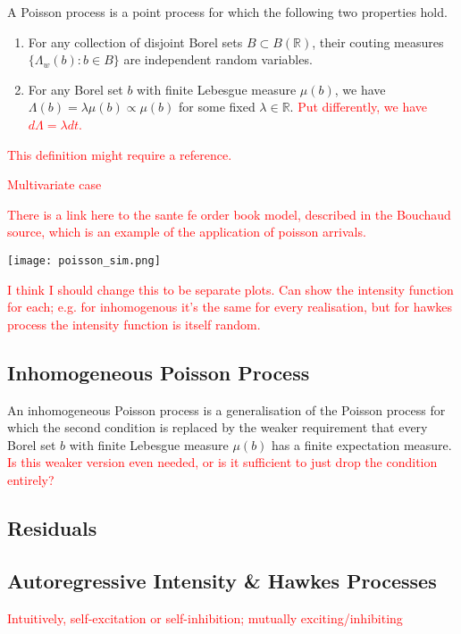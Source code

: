 \documentclass[honours,12pt]{unswthesis}
\numberwithin{equation}{section}
\begin{document}
A Poisson process is a point process for which the following two properties hold.
\begin{enumerate}
	\item For any collection of disjoint Borel sets $B\subset B(\mathbb R)$, their couting measures $\{\Lambda_w(b) : b\in B\}$ are independent random variables.
	\item For any Borel set $b$ with finite Lebesgue measure $\mu(b)$, we have $\Lambda(b)=\lambda \mu(b)\propto \mu(b)$ for some fixed $\lambda\in\mathbb{R}$. \textcolor{red}{Put differently, we have $d\Lambda=\lambda dt$.}
\end{enumerate}

\textcolor{red}{This definition might require a reference.}

\textcolor{red}{Multivariate case}

\textcolor{red}{There is a link here to the sante fe order book model, described in the Bouchaud source, which is an example of the application of poisson arrivals.}

\texttt{[image: poisson\_sim.png]}

\textcolor{red}{I think I should change this to be separate plots. Can show the intensity function for each; e.g. for inhomogenous it's the same for every realisation, but for hawkes process the intensity function is itself random.}


\subsection{Inhomogeneous Poisson Process}
An inhomogeneous Poisson process is a generalisation of the Poisson process for which the second condition is replaced by the weaker requirement that every Borel set $b$ with finite Lebesgue measure $\mu(b)$ has a finite expectation measure. \textcolor{red}{Is this weaker version even needed, or is it sufficient to just drop the condition entirely?}

\subsection{Residuals}

\subsection{Autoregressive Intensity \& Hawkes Processes}
\textcolor{red}{Intuitively, self-excitation or self-inhibition; mutually exciting/inhibiting}
\end{document}
